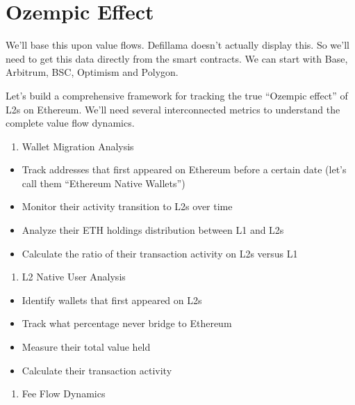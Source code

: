 \documentclass[
  letterpaper,
  DIV=11,
  numbers=noendperiod]{scrreprt}
\providecommand{\tightlist}{%
  \setlength{\itemsep}{0pt}\setlength{\parskip}{0pt}}\usepackage{longtable,booktabs,array}
\begin{document}
\section{Ozempic Effect}\label{ozempic-effect}

We'll base this upon value flows. Defillama doesn't actually display
this. So we'll need to get this data directly from the smart contracts.
We can start with Base, Arbitrum, BSC, Optimism and Polygon.

Let's build a comprehensive framework for tracking the true ``Ozempic
effect'' of L2s on Ethereum. We'll need several interconnected metrics
to understand the complete value flow dynamics.

\begin{enumerate}
\def\labelenumi{\arabic{enumi}.}
\tightlist
\item
  Wallet Migration Analysis
\end{enumerate}

\begin{itemize}
\tightlist
\item
  Track addresses that first appeared on Ethereum before a certain date
  (let's call them ``Ethereum Native Wallets'')
\item
  Monitor their activity transition to L2s over time
\item
  Analyze their ETH holdings distribution between L1 and L2s
\item
  Calculate the ratio of their transaction activity on L2s versus L1
\end{itemize}

\begin{enumerate}
\def\labelenumi{\arabic{enumi}.}
\setcounter{enumi}{1}
\tightlist
\item
  L2 Native User Analysis
\end{enumerate}

\begin{itemize}
\tightlist
\item
  Identify wallets that first appeared on L2s
\item
  Track what percentage never bridge to Ethereum
\item
  Measure their total value held
\item
  Calculate their transaction activity
\end{itemize}

\begin{enumerate}
\def\labelenumi{\arabic{enumi}.}
\setcounter{enumi}{2}
\tightlist
\item
  Fee Flow Dynamics
\end{enumerate}
\end{document}
